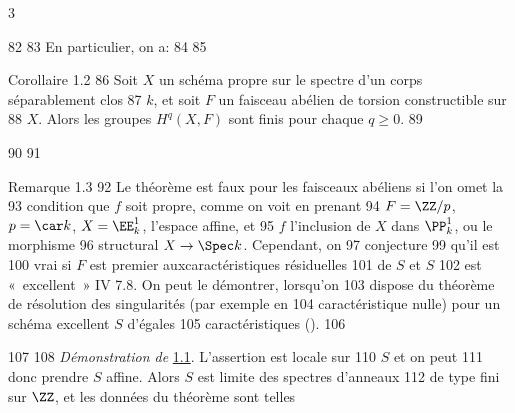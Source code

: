 3	\documentclass[10pt]{../fichiers-configuration-latex/smfart}
\begin{document}
    82	
    83	En particulier, on a:
    84	
    85	\begin{enonce*}{Corollaire 1.2}
    86	Soit $X$ un schéma propre sur le spectre d'un corps séparablement clos
    87	$k$, et soit $F$ un faisceau abélien de torsion constructible sur
    88	$X$. Alors les groupes $H^q(X,F)$ sont finis pour chaque $q\geq 0$.
    89	\end{enonce*}
    90	
    91	\begin{enonce*}[remark]{Remarque 1.3}
    92	Le théorème est faux pour les faisceaux abéliens si l'on omet la
    93	condition que $f$ soit propre, comme on voit en prenant
    94	$F=\ZZ/p$, $p=\car k$, $X=\EE^1_k$, l'espace affine, et
    95	$f$ l'inclusion de $X$ dans $\PP^1_k$, ou le morphisme
    96	structural $X\rightarrow \Spec k$. Cependant, on 
    97	conjecture
    99	qu'il est
   100	vrai si $F$ est premier aux\pageoriginale caractéristiques résiduelles
   101	de $S$ et $S$ 
   102	est « excellent » \EGA IV 7.8. On peut le démontrer, lorsqu'on
   103	dispose du théorème de résolution des singularités (par exemple en
   104	caractéristique nulle) pour un schéma excellent $S$ d'égales
   105	caractéristiques ().
   106	\end{enonce*}
   107	
   108		\emph{Démonstration de} \hyperref[XIV.thm1.1]{1.1}. L'assertion est locale sur
   110	$S$ et on peut 
   111	donc prendre $S$ affine. Alors $S$ est limite des spectres d'anneaux
   112	de type fini sur $\ZZ$, et les données du théorème sont telles
\end{document}
